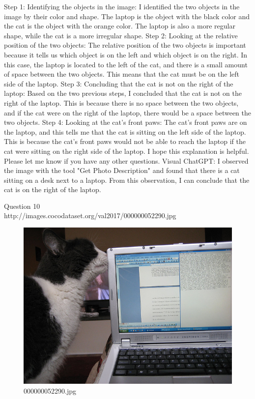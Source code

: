 \begin{enumerate}
        Step 1: Identifying the objects in the image: I identified the two objects in the image by their color and shape. The laptop is the object with the black color and the cat is the object with the orange color. The laptop is also a more regular shape, while the cat is a more irregular shape.
        Step 2: Looking at the relative position of the two objects: The relative position of the two objects is important because it tells us which object is on the left and which object is on the right. In this case, the laptop is located to the left of the cat, and there is a small amount of space between the two objects. This means that the cat must be on the left side of the laptop.
        Step 3: Concluding that the cat is not on the right of the laptop: Based on the two previous steps, I concluded that the cat is not on the right of the laptop. This is because there is no space between the two objects, and if the cat were on the right of the laptop, there would be a space between the two objects.
        Step 4: Looking at the cat's front paws: The cat's front paws are on the laptop, and this tells me that the cat is sitting on the left side of the laptop. This is because the cat's front paws would not be able to reach the laptop if the cat were sitting on the right side of the laptop.
        I hope this explanation is helpful. Please let me know if you have any other questions.
        \subitem Visual ChatGPT: I observed the image with the tool "Get Photo Description" and found that there is a cat sitting on a desk next to a laptop. From this observation, I can conclude that the cat is on the right of the laptop.
    \end{enumerate}
Question 10\\
http://images.cocodataset.org/val2017/000000052290.jpg
    \begin{figure}[h]
        \centering
        \includegraphics[width=0.8\linewidth]{../image set/easy/000000052290.jpg}
        \caption{000000052290.jpg}
    \end{figure}
